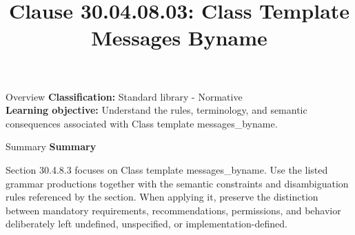\documentclass[10pt,letterpaper]{article}
\title{Clause 30.04.08.03: Class Template Messages Byname}
\author{}
\date{}
\begin{document}
\maketitle
\begin{CornellOverviewBox}{Overview}
\textbf{Classification:} Standard library - Normative\\[2pt]
\textbf{Learning objective:} Understand the rules, terminology, and semantic consequences associated with Class template messages\_byname.
\end{CornellOverviewBox}\begin{CornellSummaryBox}{Summary}
{\sffamily\bfseries\color{Accent} Summary}\par\vspace{3pt}Section 30.4.8.3 focuses on Class template messages\_byname. Use the listed grammar productions together with the semantic constraints and disambiguation rules referenced by the section. When applying it, preserve the distinction between mandatory requirements, recommendations, permissions, and behavior deliberately left undefined, unspecified, or implementation-defined.
\end{CornellSummaryBox}
\end{document}
